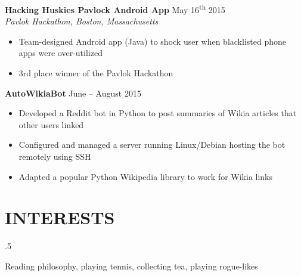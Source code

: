\documentclass[overlapped,line]{res}
\begin{document}
\begin{resume}
\textbf{Hacking Huskies Pavlock Android App} \hfill            May 16\textsuperscript{th} 2015\\
                {\sl Pavlok Hackathon, Boston, Massachusetts}
                 \begin{itemize}  \itemsep -2pt
                 \item Team-designed Android app (Java) to shock user when blacklisted phone apps were over-utilized
                 \item 3rd place winner of the Pavlok Hackathon
                 \end{itemize} 

\textbf{AutoWikiaBot} \hfill            June \--- August 2015
                  \begin{itemize}  \itemsep -2pt
                  \item Developed a Reddit bot in Python to post summaries of Wikia articles that other users linked
                  \item Configured and managed a server running Linux/Debian hosting the bot remotely using SSH
                  \item Adapted a popular Python Wikipedia library to work for Wikia links
                  \end{itemize}

\noindent\makebox[7.15in]{\rule{7.15in}{0.4pt}}

\section{INTERESTS} \moveleft.5\hoffset\centerline{Reading philosophy, playing tennis, collecting tea, playing rogue-likes}

\end{resume}
\end{document}

